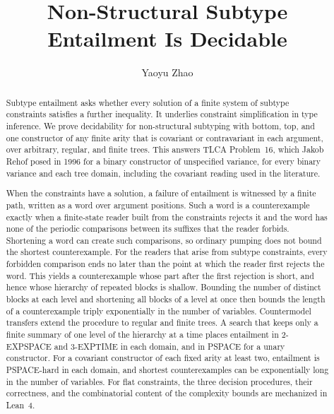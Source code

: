 \documentclass[acmsmall,screen,review,anonymous,nonacm]{acmart}
\begin{document}
\title{Non-Structural Subtype Entailment Is Decidable}

\author{Yaoyu Zhao}

\begin{abstract}
Subtype entailment asks whether every solution of a finite system of subtype
constraints satisfies a further inequality. It underlies constraint
simplification in type inference. We prove decidability for non-structural
subtyping with bottom, top, and one constructor of any finite arity that is
covariant or contravariant in each argument, over arbitrary, regular, and
finite trees. This answers TLCA Problem~16, which Jakob Rehof posed in 1996
for a binary constructor of unspecified variance, for every binary variance
and each tree domain, including the covariant reading used in the
literature.

When the constraints have a solution, a failure of entailment is witnessed
by a finite path, written as a word over argument positions. Such a word is
a counterexample exactly when a finite-state reader built from the
constraints rejects it and the word has none of the periodic comparisons
between its suffixes that the reader forbids. Shortening a word can create
such comparisons, so ordinary pumping does not bound the shortest
counterexample. For the readers that arise from subtype constraints, every
forbidden comparison ends no later than the point at which the reader first
rejects the word. This yields a counterexample whose part after the first
rejection is short, and hence whose hierarchy of repeated blocks is
shallow. Bounding the number of distinct blocks at each level and shortening
all blocks of a level at once then bounds the length of a counterexample
triply exponentially in the number of variables. Countermodel transfers extend the procedure to
regular and finite trees. A search that keeps only a finite summary of one
level of the hierarchy at a time places entailment in 2-EXPSPACE and
3-EXPTIME in each domain, and in PSPACE for a unary constructor. For a
covariant constructor of each fixed arity at least two, entailment is
PSPACE-hard in each domain, and shortest counterexamples can be
exponentially long in the number of variables. For flat constraints, the
three decision procedures, their correctness, and the combinatorial content
of the complexity bounds are mechanized in Lean~4.
\end{abstract}
\end{document}

